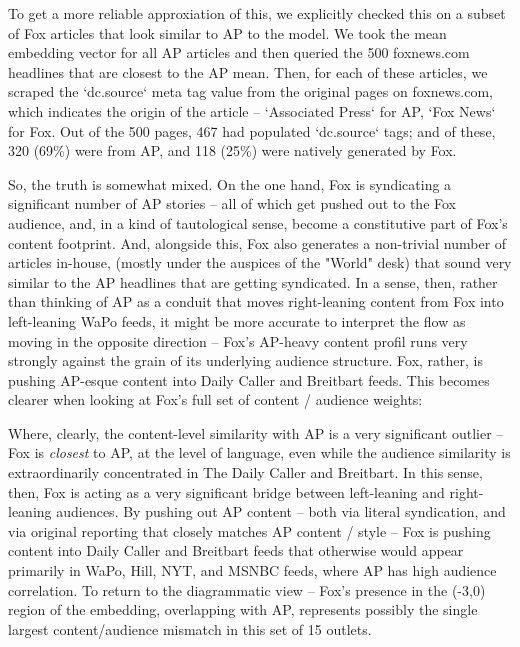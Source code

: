 \documentclass{scrartcl}
\begin{document}
To get a more reliable approxiation of this, we explicitly checked this on a subset of Fox articles that look similar to AP to the model. We took the mean embedding vector for all AP articles and then queried the 500 foxnews.com headlines that are closest to the AP mean. Then, for each of these articles, we scraped the `dc.source` meta tag value from the original pages on foxnews.com, which indicates the origin of the article -- `Associated Press` for AP, `Fox News` for Fox. Out of the 500 pages, 467 had populated `dc.source` tags; and of these, 320 (69\%) were from AP, and 118 (25\%) were natively generated by Fox.

So, the truth is somewhat mixed. On the one hand, Fox is syndicating a significant number of AP stories -- all of which get pushed out to the Fox audience, and, in a kind of tautological sense, become a constitutive part of Fox's content footprint. And, alongside this, Fox also generates a non-trivial number of articles in-house, (mostly under the auspices of the "World" desk) that sound very similar to the AP headlines that are getting syndicated. In a sense, then, rather than thinking of AP as a conduit that moves right-leaning content from Fox into left-leaning WaPo feeds, it might be more accurate to interpret the flow as moving in the opposite direction -- Fox's AP-heavy content profil runs very strongly against the grain of its underlying audience structure. Fox, rather, is pushing AP-esque content into Daily Caller and Breitbart feeds. This becomes clearer when looking at Fox's full set of content / audience weights:


Where, clearly, the content-level similarity with AP is a very significant outlier -- Fox is \textit{closest} to AP, at the level of language, even while the audience similarity is extraordinarily concentrated in The Daily Caller and Breitbart. In this sense, then, Fox is acting as a very significant bridge between left-leaning and right-leaning audiences. By pushing out AP content -- both via literal syndication, and via original reporting that closely matches AP content / style -- Fox is pushing content into Daily Caller and Breitbart feeds that otherwise would appear primarily in WaPo, Hill, NYT, and MSNBC feeds, where AP has high audience correlation. To return to the diagrammatic view -- Fox's presence in the (-3,0) region of the embedding, overlapping with AP, represents possibly the single largest content/audience mismatch in this set of 15 outlets.
\end{document}
